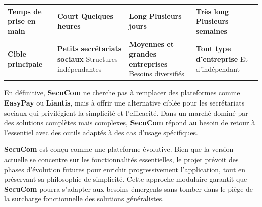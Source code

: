 \begin{table}[H]
{\begin{tabular}{p{3.2cm}p{4.2cm}p{4.2cm}p{4.2cm}}
\textbf{Temps de prise en main} & 
\textcolor{green!70!black}{\small\textbf{Court}} \newline
\small{Quelques heures} & 
\textcolor{orange!70!black}{\small\textbf{Long}} \newline
\small{Plusieurs jours} & 
\textcolor{red!70!black}{\small\textbf{Très long}} \newline
\small{Plusieurs semaines} \\
\midrule

\textbf{Cible principale} & 
\textbf{Petits secrétariats sociaux} \newline
\small{Structures indépendantes} & 
\textbf{Moyennes et grandes entreprises} \newline
\small{Besoins diversifiés} & 
\textbf{Tout type d'entreprise} \newline
\small{Et d'indépendant} \\
\bottomrule
\end{tabular}%
}
\end{table}

\noindent En définitive, \textbf{SecuCom} ne cherche pas à remplacer des plateformes comme \textbf{EasyPay} ou \textbf{Liantis}, mais à offrir une alternative ciblée pour les secrétariats sociaux qui privilégient la simplicité et l'efficacité. Dans un marché dominé par des solutions complètes mais complexes, \textbf{SecuCom} répond au besoin de retour à l'essentiel avec des outils adaptés à des cas d'usage spécifiques.

\vspace{0.5cm}

\begin{tcolorbox}[
  title={\textbf{Évolutivité de SecuCom}},
  colback=blue!5!white,
  colframe=primarycolor,
  fonttitle=\bfseries,
  boxrule=0.5mm,
  arc=2mm,
  left=6mm,
  right=6mm,
  top=6mm,
  bottom=6mm
]
\noindent \textbf{SecuCom} est conçu comme une plateforme évolutive. Bien que la version actuelle se concentre sur les fonctionnalités essentielles, le projet prévoit des phases d'évolution futures pour enrichir progressivement l'application, tout en préservant sa philosophie de simplicité. Cette approche modulaire garantit que \textbf{SecuCom} pourra s'adapter aux besoins émergents sans tomber dans le piège de la surcharge fonctionnelle des solutions généralistes.
\end{tcolorbox}
